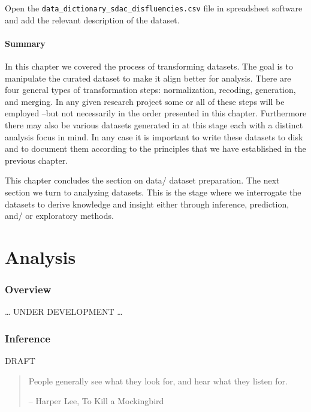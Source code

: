 \documentclass[
]{article}
\begin{document}
Open the \texttt{data\_dictionary\_sdac\_disfluencies.csv} file in spreadsheet software and add the relevant description of the dataset.

\hypertarget{summary-9}{%
\subsection*{Summary}\label{summary-9}}

In this chapter we covered the process of transforming datasets. The goal is to manipulate the curated dataset to make it align better for analysis.
There are four general types of transformation steps: normalization, recoding, generation, and merging. In any given research project some or all of these steps will be employed --but not necessarily in the order presented in this chapter. Furthermore there may also be various datasets generated in at this stage each with a distinct analysis focus in mind. In any case it is important to write these datasets to disk and to document them according to the principles that we have established in the previous chapter.

This chapter concludes the section on data/ dataset preparation. The next section we turn to analyzing datasets. This is the stage where we interrogate the datasets to derive knowledge and insight either through inference, prediction, and/ or exploratory methods.

\hypertarget{part-analysis}{%
\part{Analysis}\label{part-analysis}}

\hypertarget{analysis-overview}{%
\section*{Overview}\label{analysis-overview}}

\ldots{} UNDER DEVELOPMENT \ldots{}

\hypertarget{inference}{%
\section{Inference}\label{inference}}

DRAFT

\begin{quote}
People generally see what they look for, and hear what they listen for.

-- Harper Lee, To Kill a Mockingbird
\end{quote}
\end{document}
